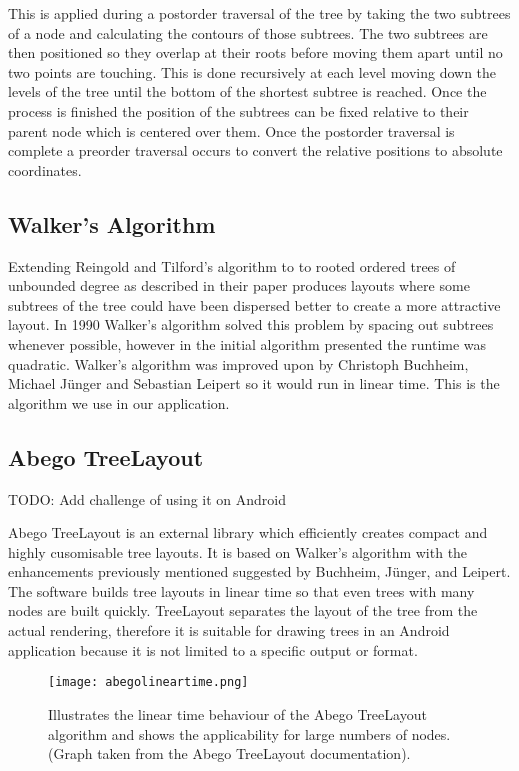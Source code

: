 \documentclass{report}
\begin{document}
This is applied during a postorder traversal of the tree by taking the two subtrees of a node and calculating the contours of those subtrees. The two subtrees are then positioned so they overlap at their roots before moving them apart until no two points are touching. This is done recursively at each level moving down the levels of the tree until the bottom of the shortest subtree is reached. Once the process is finished the position of the subtrees can be fixed relative to their parent node which is centered over them. Once the postorder traversal is complete a preorder traversal occurs to convert the relative positions to absolute coordinates.

\subsection{Walker's Algorithm}

Extending Reingold and Tilford's algorithm to to rooted ordered trees of unbounded degree as described in their paper produces layouts where some subtrees of the tree could have been dispersed better to create a more attractive layout. In 1990 Walker's algorithm solved this problem by spacing out subtrees whenever possible, however in the initial algorithm presented the runtime was quadratic. Walker's algorithm was improved upon by Christoph Buchheim, Michael J\"unger and Sebastian Leipert so it would run in linear time\cite{improvingwalkers}. This is the algorithm we use in our application. 

\subsection{Abego TreeLayout}
\label{sub:abego_treelayout}

TODO: Add challenge of using it on Android

Abego TreeLayout is an external library which efficiently creates compact and highly cusomisable tree layouts. It is based on Walker's algorithm with the enhancements previously mentioned suggested by Buchheim, J\"unger, and Leipert\cite{treelayoutlineartime}. The software builds tree layouts in linear time so that even trees with many nodes are built quickly. TreeLayout separates the layout of the tree from the actual rendering, therefore it is suitable for drawing trees in an Android application because it is not limited to a specific output or format.

\begin{figure}[ht]
    \centering
    \texttt{[image: abegolineartime.png]}
    \caption{Illustrates the linear time behaviour of the Abego TreeLayout algorithm\cite{abegolineartime} and shows the applicability for large numbers of nodes. (Graph taken from the Abego TreeLayout documentation).}
    \label{abegolineartime}
\end{figure}
\end{document}
